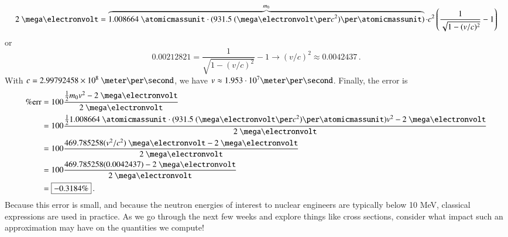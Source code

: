 {\begin{equation*}
  2~\mega\electronvolt = \overbrace{1.008664~\atomicmassunit \cdot (931.5~(\mega\electronvolt\per c^2)\per\atomicmassunit)}^{m_0} \cdot c^2 \left (\frac{1}{\sqrt{1 - (v/c)^2}} - 1 \right )
\end{equation*}
or
\begin{equation*}
 0.00212821 = \frac{1}{\sqrt{1 - (v/c)^2}} - 1 \rightarrow \boxed{(v/c)^2 \approx 0.0042437} \, .
\end{equation*}
With  $c=2.99792458\times 10^{8}~\meter\per\second$, we have
$v \approx 1.953\cdot 10^7 \meter\per\second$.  Finally, the error is
\begin{equation*}
\begin{split}
 \%\text{err} &= 100\frac{\frac{1}{2} m_0 v^2 - 2~\mega\electronvolt}
                      {2~\mega\electronvolt} \\
              &= 100\frac{\frac{1}{2} 1.008664~\atomicmassunit \cdot (931.5~(\mega\electronvolt\per c^2)\per\atomicmassunit ) v^2 -2~\mega\electronvolt}
                      {2~\mega\electronvolt} \\
              &= 100\frac{469.785258 (v^2/c^2)~\mega\electronvolt - 2~\mega\electronvolt}
                      {2~\mega\electronvolt} \, \\
              &= 100\frac{469.785258 (0.0042437) - 2~\mega\electronvolt}
                      {2~\mega\electronvolt} \, \\
              &= \boxed{-0.3184\%} \, .
\end{split}
\end{equation*}
Because this error is small, and because the neutron energies of interest to nuclear engineers are typically below 10 MeV, classical expressions are used in practice.  As we go through the next few weeks and explore things like cross sections, consider what impact such an approximation may have on the quantities we compute!


} %
\newpage
\else
\fi


